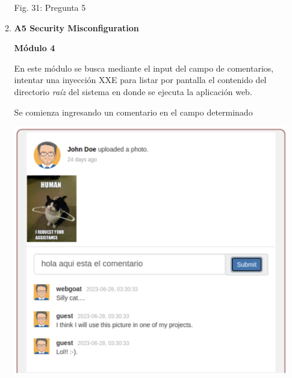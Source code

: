 \documentclass[12pt,oneside,a4paper]{book}
\begin{document}
\begin{enumerate}
\begin{enumerate}
\begin{center}
            \vspace{0.1em}
            
            Fig. 31: Pregunta 5
        \end{center}
        
        \newpage






        \item{\textbf{A5 Security Misconfiguration}}

        \vspace{1em}
        
        \textbf{Módulo 4}
        
        \vspace{1em}

        \hspace{20pt}
        En este módulo se busca mediante el input del campo de comentarios, intentar una inyección XXE para listar por pantalla el contenido del directorio \textit{raíz} del sistema en donde se ejecuta la aplicación web.
        
        \vspace{1em}

        \hspace{20pt}
        Se comienza ingresando un comentario en el campo determinado
        
        \vspace{2em}

        \begin{center}
            \includegraphics[width=12cm]{img/xxe0.png}
            

\end{center}
\end{enumerate}
\end{enumerate}
\end{document}
